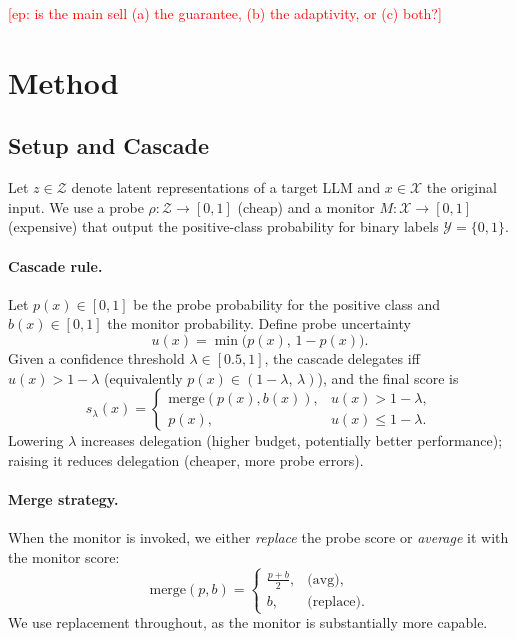 \documentclass{article}
\newcommand{\edoardo}[1]{\textcolor{red}{[ep: #1]}}
\newcommand{\probe}{\rho}
\newcommand{\monitor}{M}
\begin{document}
\edoardo{is the main sell (a) the guarantee, (b) the adaptivity, or (c) both?}


\section{Method}
\label{sec:method}

\subsection{Setup and Cascade}
\label{sec:cascade}

Let $z \in \mathcal{Z}$ denote latent representations of a target LLM and $x \in \mathcal{X}$ the original input.
We use a probe $\probe: \mathcal{Z} \to [0,1]$ (cheap) and a monitor $\monitor: \mathcal{X} \to [0,1]$ (expensive) that output the positive-class probability for binary labels $\mathcal{Y}=\{0,1\}$.

\paragraph{Cascade rule.}
Let $p(x) \in [0,1]$ be the probe probability for the positive class and $b(x) \in [0,1]$ the monitor probability. Define probe uncertainty
\begin{equation}
    \label{eq:uncertainty}
    u(x) = \min\big(p(x),\, 1 - p(x)\big).
\end{equation}
Given a confidence threshold $\lambda \in [0.5, 1]$, the cascade delegates iff $u(x) > 1-\lambda$ (equivalently $p(x) \in (1-\lambda,\,\lambda)$), and the final score is
\begin{equation}
    \label{eq:cascade}
    s_\lambda(x) =
    \begin{cases}
        \mathrm{merge}(p(x), b(x)), & u(x) > 1-\lambda, \\
        p(x), & u(x) \le 1-\lambda.
    \end{cases}
\end{equation}
Lowering $\lambda$ increases delegation (higher budget, potentially better performance); raising it reduces delegation (cheaper, more probe errors).

\paragraph{Merge strategy.}
When the monitor is invoked, we either \emph{replace} the probe score or \emph{average} it with the monitor score:
\begin{equation}
    \label{eq:merge}
    \mathrm{merge}(p,b) =
    \begin{cases}
        \tfrac{p + b}{2}, & \text{(avg)}, \\
        b, & \text{(replace)}.
    \end{cases}
\end{equation}
We use replacement throughout, as the monitor is substantially more capable.
\end{document}
